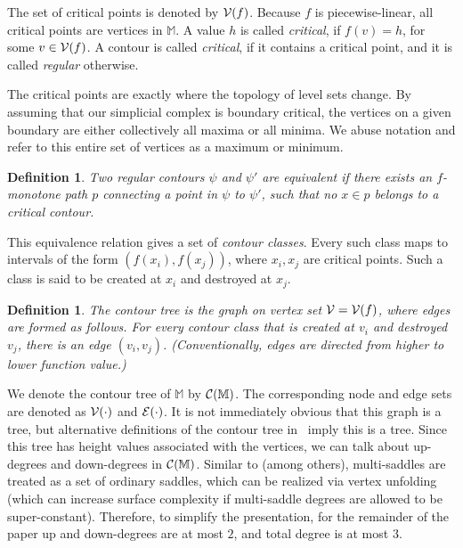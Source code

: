 \documentclass[11pt]{article}
\newtheorem{definition}[theorem]{Definition}
\theoremstyle{definition}
\newcommand{\cC}{{\cal C}}
\newcommand{\cE}{{\cal E}}
\newcommand{\cV}{{\cal V}}
\newcommand{\MM}{\mathbb{M}}
\newcommand{\reeb}{\cC}
\begin{document}
The set of critical points is denoted by $\cV(f)$.
Because $f$ is piecewise-linear, all critical points are vertices in $\MM$. 
A value $h$ is called \emph{critical}, if $f(v) = h$, for some $v \in \cV(f)$. 
A contour is called \emph{critical}, if it contains a critical point, and it is called \emph{regular} otherwise.

The critical points are exactly where the topology of level sets change.
By assuming that our simplicial complex is boundary critical, the vertices on a given boundary are either collectively all maxima or all minima.  
We abuse notation and refer to this entire set of vertices as a maximum or minimum.


\begin{definition} \label{def:equiv} Two regular contours $\psi$ and $\psi'$ are \emph{equivalent} 
if there exists an $f$-monotone path $p$ connecting a point in $\psi$ to $\psi'$,
such that no $x \in p$ belongs to a critical contour.
\end{definition}

This equivalence relation gives a set of \emph{contour classes}. 
Every such class maps to intervals
of the form $(f(x_i),f(x_j))$, where $x_i, x_j$ are critical points. Such a class is said
to be created at $x_i$ and destroyed at $x_j$. 

\begin{definition} \label{def:tree} The \emph{contour tree} is the graph on vertex set $\cV= \cV(f)$, where
edges are formed as follows. For every contour class that is created at $v_i$ and destroyed $v_j$,
there is an edge $(v_i,v_j)$. (Conventionally, edges are directed from higher to lower function value.)
\end{definition}

We denote the contour tree of $\MM$
by $\reeb(\MM)$. The corresponding node and edge sets are denoted as $\cV(\cdot)$ and $\cE(\cdot)$.
It is not immediately obvious that this graph is a tree, but alternative definitions of the contour tree
in~\cite{csa-cctad-03} imply this is a tree. 
Since this tree has height values associated with the vertices, we can talk about up-degrees and down-degrees in $\reeb(\MM)$.
%
Similar to \cite{kobps-ctsssit-97} (among others), multi-saddles are treated as a set of ordinary saddles, which can be realized 
via vertex unfolding (which can increase surface complexity if multi-saddle degrees are allowed to be super-constant).
Therefore, to simplify the presentation, for the remainder of the paper up and down-degrees are at most $2$, and total degree is at most $3$.
%
\end{document}
